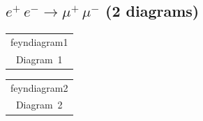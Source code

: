 \documentclass[a4paper,11pt]{article}
\makeatletter
\newcommand{\FeynDiagram}[1]{\csname feyndiagram#1\endcsname}
\newcommand{\FeynCell}[1]{\begin{tabular}[t]{@{}c@{}}\FeynDiagram{#1}\\[1ex]\small Diagram~#1\end{tabular}}
\makeatother
\begin{document}
\setlength{\parindent}{0pt}
\subsection*{$e^{+}\,e^{-} \to \mu^{+}\,\mu^{-}$ \normalfont(2 diagrams)}
\noindent \FeynCell{1}\hfill \FeynCell{2}\par\bigskip
\end{document}
